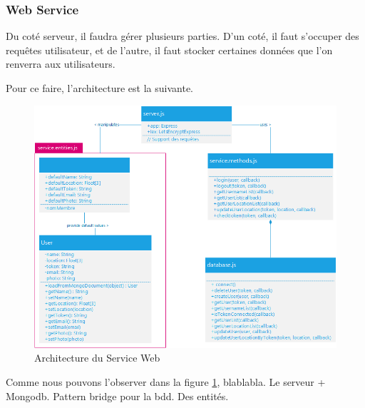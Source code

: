 \subsubsection{Web Service}

    Du coté serveur, il faudra gérer plusieurs parties. D'un coté, il faut s'occuper des requêtes utilisateur, et de l'autre, il faut stocker certaines données que l'on renverra aux utilisateurs.

    Pour ce faire, l'architecture est la suivante.

    \begin{figure}[H]
        \centering
        \includegraphics[width=\textwidth]{./img/architecture-service-web.png}
        \caption{Architecture du Service Web}
        \label{asweb}
    \end{figure}

    Comme nous pouvons l'observer dans la figure \ref{asweb}, blablabla.
    Le serveur + Mongodb.
    Pattern bridge pour la bdd. Des entités.